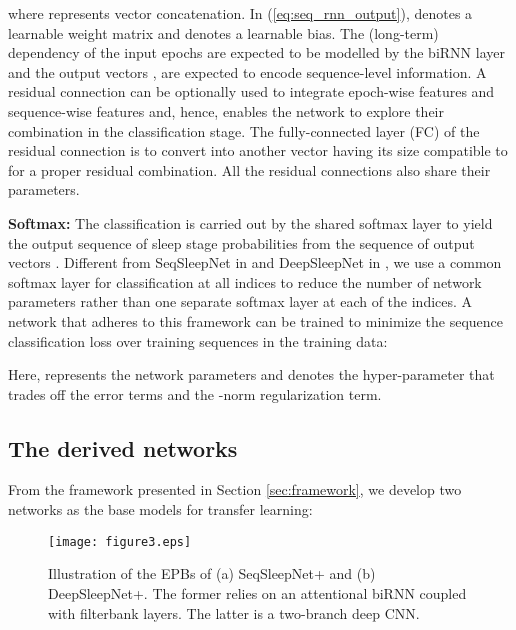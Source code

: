 \documentclass[journal,twoside,web]{ieeecolor}
\begin{document}
where  represents vector concatenation. In (\ref{eq:seq_rnn_output}),  denotes a learnable weight matrix and  denotes a learnable bias. The (long-term) dependency of the input epochs are expected to be modelled by the biRNN layer and the output vectors ,  are expected to encode sequence-level information. A residual connection can be optionally used to integrate epoch-wise features  and sequence-wise features  and, hence, enables the network to explore their combination in the classification stage. The fully-connected layer (FC) of the residual connection is to convert  into another vector having its size compatible to  for a proper residual combination. All the residual connections also share their parameters. 

{\bf Softmax:} The classification is carried out by the shared softmax layer to yield the output sequence of sleep stage probabilities  from the sequence of output vectors . Different from SeqSleepNet in \cite{Phan2019a} and DeepSleepNet in \cite{Supratak2017}, we use a common softmax layer for classification at all indices  to reduce the number of network parameters rather than one separate softmax layer at each of the indices.
A network that adheres to this framework can be trained to minimize the sequence classification loss over  training sequences in the training data:

Here,  represents the network parameters and  denotes the hyper-parameter that trades off the error terms and the -norm regularization term.

\vspace{-0.2cm}
\subsection{The derived networks}
From the framework presented in Section \ref{sec:framework}, we develop two networks as the base models for transfer learning:

\begin{figure} [!t]
	\centering
	\texttt{[image: figure3.eps]}
	\vspace{-0.1cm}
	\caption{Illustration of the EPBs of (a) SeqSleepNet+ and (b) DeepSleepNet+. The former relies on an attentional biRNN coupled with filterbank layers. The latter is a two-branch deep CNN.}
	\label{fig:EFE}
	\vspace{-0.25cm}
\end{figure}
\end{document}
